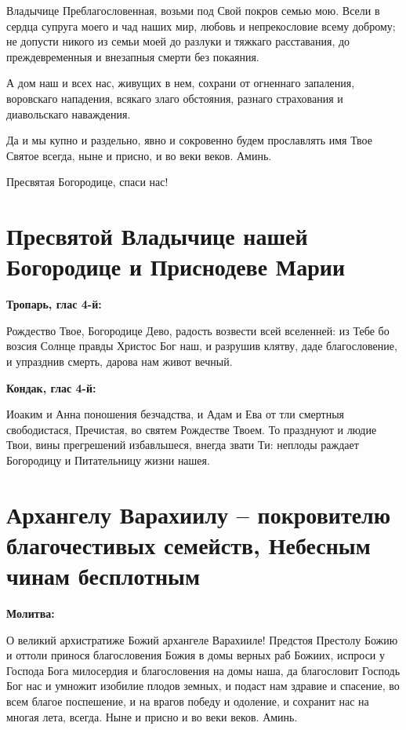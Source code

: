 Владычице Преблагословенная, возьми под Свой покров семью мою. Всели в сердца супруга моего и чад наших мир, любовь и непрекословие всему доброму;  не допусти никого из семьи моей до разлуки и тяжкаго расставания, до преждевременныя и внезапныя смерти без покаяния.

А дом наш и всех нас, живущих в нем, сохрани от огненнаго запаления, воровскаго нападения, всякаго злаго обстояния, разнаго страхования и диавольскаго наваждения.

Да и мы купно и раздельно, явно и сокровенно будем прославлять имя Твое Святое всегда, ныне и присно, и во веки веков. Аминь.


Пресвятая Богородице, спаси нас!



 

\section{Пресвятой Владычице нашей Богородице и Приснодеве Марии}
 


\bfseries Тропарь, глас 4-й:\normalfont{}


Рождество Твое, Богородице Дево, радость возвести всей вселенней: из Тебе бо возсия Солнце правды Христос Бог наш, и разрушив клятву, даде благословение, и упразднив смерть, дарова нам живот вечный.


\medskip


\bfseries Кондак, глас 4-й:\normalfont{}


Иоаким и Анна поношения безчадства, и Адам и Ева от тли смертныя свободистася, Пречистая, во святем Рождестве Твоем. То празднуют и людие Твои, вины прегрешений избавльшеся, внегда звати Ти: неплоды раждает Богородицу и Питательницу жизни нашея.


\section{Архангелу Варахиилу – покровителю благочестивых семейств, Небесным чинам бесплотным}
 
\bfseries Молитва:\normalfont{}


О великий архистратиже Божий архангеле Варахииле! Предстоя Престолу Божию и оттоли принося благословения Божия в домы верных раб Божиих, испроси у Господа Бога милосердия и благословения на домы наша, да благословит Господь Бог нас и умножит изобилие плодов земных, и подаст нам здравие и спасение, во всем благое поспешение, и на врагов победу и одоление, и сохранит нас на многая лета, всегда. Ныне и присно и во веки веков. Аминь. 

